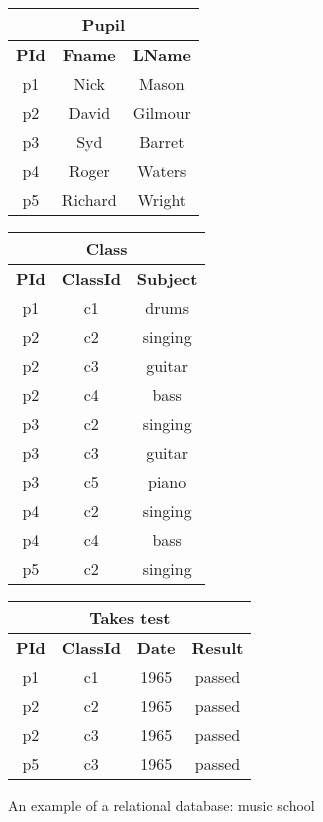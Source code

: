  \begin{figure}[htb]
        
        \begin{tabular}{|c c c|}
            \multicolumn{3}{c}{\textbf{Pupil}}\\
      \hline
            \textbf{PId} & \textbf{Fname} & \textbf{LName}\\ \hline
        p1 &  Nick  & Mason\\
        p2 &  David & Gilmour\\
        p3 &  Syd   & Barret\\
        p4 &  Roger & Waters\\
        p5 &  Richard & Wright \\\hline
    \end{tabular}
     \hfill
        \begin{tabular}{|c c c|}
            \multicolumn{3}{c}{\textbf{Class}}\\
      \hline
            \textbf{PId} & \textbf{ClassId} & \textbf{Subject}\\ \hline
       p1 & c1& drums \\
       p2 & c2& singing \\
       p2 & c3& guitar\\
       p2 & c4& bass \\
       p3 & c2& singing\\
       p3 & c3& guitar\\
       p3 & c5& piano\\
       p4 & c2& singing\\
       p4 & c4& bass\\
       p5 & c2& singing \\\hline
        \end{tabular}
        \hfill
        \begin{tabular}{|c c c c|}
            \multicolumn{4}{c}{\textbf{Takes test}}\\
      \hline
            \textbf{PId} & \textbf{ClassId} & \textbf{Date} &
            \textbf{Result}\\ \hline
            p1 & c1 & 1965 & passed\\
            p2 & c2 & 1965 & passed\\
            p2 & c3 & 1965 & passed\\
            p5 & c3 & 1965 & passed\\\hline
    \end{tabular}
    \caption{An example of a relational database: music school}
    \label{fig:relational_database_school}
    \end{figure}

